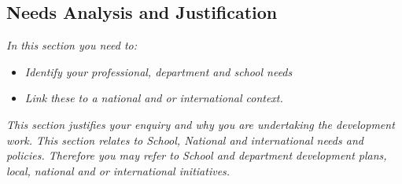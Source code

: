 \subsection{Needs Analysis and Justification}
\textit{In this section you need to:}

\begin{itemize}
\item{\textit{Identify your professional, department and school needs }}
\item\textit{{Link these to a national and or international context.}}
\end{itemize}

\textit{This section justifies your enquiry and why you are undertaking the development work. This section relates to School, National and international needs and policies. Therefore you may refer to School and department development plans, local, national and or international initiatives.}